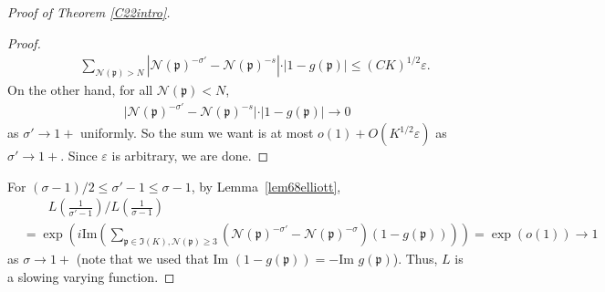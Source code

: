 \documentclass[11pt]{amsart}
\theoremstyle{definition}
\newcommand{\NN}{{\mathcal N}}
\newcommand{\Z}{{\mathbb Z}}
\newcommand{\mf}{\mathfrak}
\begin{document}
\begin{proof}[Proof of Theorem \ref{C22intro}]
\begin{proof}
\begin{equation}
\begin{split}
               &\qquad \sum_{\NN(\mf p)>N}\left| \NN(\mf p)^{-\sigma'}-\NN(\mf p)^{-s}\right| \cdot \vert 1-g(\mf p)\vert\leq (CK)^{1/2}\varepsilon.              
           \end{split}
       \end{equation}
 On the other hand, for all $\NN(\mf p)<N$,
       \begin{equation}\nonumber
           \begin{split}
               \vert \NN(\mf p)^{-\sigma'}-\NN(\mf p)^{-s}\vert \cdot \vert 1-g(\mf p)\vert\to 0              
           \end{split}
       \end{equation}
       as $\sigma'\to 1+$ uniformly. So the sum we want is at most $o(1)+O(K^{1/2}\varepsilon)$ as $\sigma'\to 1+$. Since $\varepsilon$ is arbitrary, we are done.
   \end{proof}

For $(\sigma-1)/2\leq \sigma'-1\leq \sigma-1$,  by Lemma~\ref{lem68elliott},
    \begin{equation}\nonumber
   \begin{split}
    &\qquad L\left(\frac{1}{\sigma'-1}\right)/L\left(\frac{1}{\sigma-1}\right)
    \\&=\exp\left(i\text{Im}\left(\sum_{\mf p \in \mf I(K), \NN(\mf p)\geq 3}(\NN(\mf p)^{-\sigma'}-\NN(\mf p)^{-\sigma})(1-g(\mf p))\right)\right)=\exp(o(1))\to 1
   \end{split}
   \end{equation}
   as $\sigma\to 1+$ (note that we used that $\text{Im  }(1-g(\mf p))=-\text{Im }g(\mf p)$).
  Thus, $L$ is a slowing varying function. 
  

\end{proof}
\end{document}
